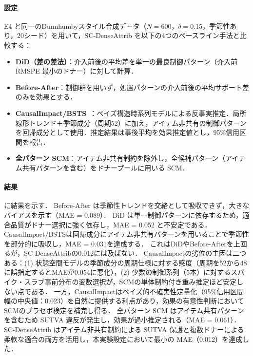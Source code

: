 \paragraph{設定}
E4 と同一のDunnhumbyスタイル合成データ（$N=600$，$\delta=0.15$，季節性あり，20シード）を用いて，SC-DenseAttrib を以下の4つのベースライン手法と比較する：
\begin{itemize}
    \item \textbf{DiD（差の差法）}：介入前後の平均差を単一の最良制御パターン（介入前 RMSPE 最小のドナー）に対して計算．
    \item \textbf{Before-After}：制御群を用いず，処置パターンの介入前後の平均サポート差のみを効果とする．
    \item \textbf{CausalImpact/BSTS}~\cite{brodersen2015inferring}：ベイズ構造時系列モデルによる反事実推定．局所線形トレンド＋季節成分（周期52）に加え，アイテム非共有の制御パターンを回帰成分として使用．推定結果は事後平均を効果推定値とし，95\%信用区間を報告．
    \item \textbf{全パターン SCM}：アイテム非共有制約を除外し，全候補パターン（アイテム共有パターンを含む）をドナープールに用いる SCM．
\end{itemize}

\paragraph{結果}
 に結果を示す．
Before-After は季節性トレンドを交絡として吸収できず，大きなバイアスを示す（MAE = 0.089）．
DiD は単一制御パターンに依存するため，適合品質がドナー選択に強く依存し，MAE = 0.052 と不安定である．
CausalImpact/BSTSは回帰成分にアイテム非共有パターンを用いることで季節性を部分的に吸収し，MAE = 0.031を達成する．
これはDiDやBefore-Afterを上回るが，SC-DenseAttribの0.012には及ばない．
CausalImpactの劣位の主因は二つある：(1) 状態空間モデルの季節成分の周期仕様に対する感度（周期を52から48に誤指定するとMAEが0.054に悪化），(2) 少数の制御系列（5本）に対するスパイク・スラブ事前分布の変数選択が，SCMの単体制約付き重み推定ほど安定しない点である．
一方，CausalImpactはベイズ的不確実性定量化（95\%信用区間幅の中央値：0.023）を自然に提供する利点があり，効果の有意性判断においてSCMのプラセボ検定を補完し得る．
全パターン SCM はアイテム共有パターンを含むため SUTVA 違反が発生し，効果が過小推定される（MAE = 0.061）．
SC-DenseAttrib はアイテム非共有制約による SUTVA 保護と複数ドナーによる柔軟な適合の両方を活用し，本実験設定において最小の MAE（0.012）を達成した．

